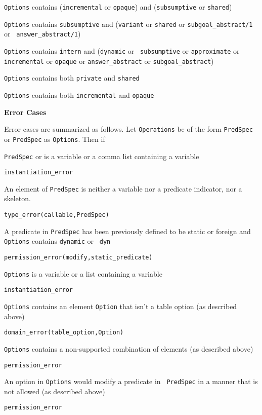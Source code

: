 \begin{description}
\item {\tt Options} contains ({\tt incremental} or {\tt opaque}) and
  ({\tt subsumptive} or {\tt shared})

\item {\tt Options} contains {\tt subsumptive} and ({\tt variant} or
  {\tt shared} or {\tt subgoal\_abstract/1} or {\tt
    answer\_abstract/1})

\item {\tt Options} contains {\tt intern} and ({\tt dynamic} or {\tt
subsumptive} or {\tt approximate} or {\tt incremental} or {\tt opaque}
or {\tt answer\_abstract} or {\tt subgoal\_abstract})
%
\item {\tt Options} contains both {\tt private} and {\tt shared}
%
\item {\tt Options} contains both {\tt incremental} and {\tt opaque}
\ei

{\bf Error Cases}

Error cases are summarized as follows.  Let {\tt Operations} be of the
form {\tt PredSpec} or {\tt PredSpec} as {\tt Options}.  Then if 
%
\bi
\item {\tt PredSpec} or is a variable or a comma list containing a variable
\bi
\item {\tt instantiation\_error}
\ei
\item An element of {\tt PredSpec} is neither a variable nor a
  predicate indicator, nor a skeleton.
\bi
\item 	{\tt type\_error(callable,PredSpec)}
\ei
\item A predicate in {\tt PredSpec} has been previously defined to be
  static or foreign and {\tt Options} contains {\tt dynamic} or {\tt
    dyn}
\bi
\item 	{\tt permission\_error(modify,static\_predicate)}
\ei
\item {\tt Options} is a variable or a list containing a variable
\bi
\item {\tt instantiation\_error}
\ei
\item {\tt Options} contains an element {\tt Option} that isn't a table option (as described above)
\bi
\item {\tt domain\_error(table\_option,Option)}
\ei
\item {\tt Options} contains a non-supported combination of  elements (as described above)
\bi
\item {\tt permission\_error}
\ei
\item An option in {\tt Options} would modify a predicate in {\tt
  PredSpec} in a manner that is not allowed (as described above) 
\bi
\item {\tt permission\_error}
\ei
\ei


\end{description}
